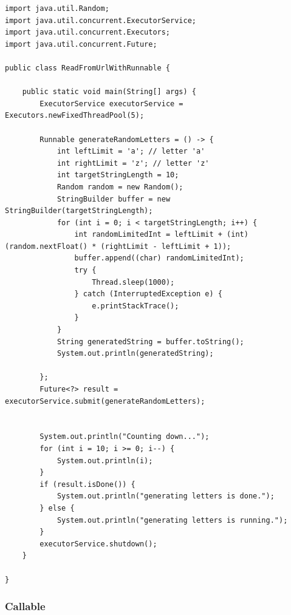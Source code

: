 \begin{lstlisting}
import java.util.Random;
import java.util.concurrent.ExecutorService;
import java.util.concurrent.Executors;
import java.util.concurrent.Future;

public class ReadFromUrlWithRunnable {

	public static void main(String[] args) {
		ExecutorService executorService = Executors.newFixedThreadPool(5);

		Runnable generateRandomLetters = () -> {
			int leftLimit = 'a'; // letter 'a'
			int rightLimit = 'z'; // letter 'z'
			int targetStringLength = 10;
			Random random = new Random();
			StringBuilder buffer = new StringBuilder(targetStringLength);
			for (int i = 0; i < targetStringLength; i++) {
				int randomLimitedInt = leftLimit + (int) (random.nextFloat() * (rightLimit - leftLimit + 1));
				buffer.append((char) randomLimitedInt);
				try {
					Thread.sleep(1000);
				} catch (InterruptedException e) {
					e.printStackTrace();
				}
			}
			String generatedString = buffer.toString();
			System.out.println(generatedString);

		};
		Future<?> result = executorService.submit(generateRandomLetters);


		System.out.println("Counting down...");
		for (int i = 10; i >= 0; i--) {
			System.out.println(i);
		}
		if (result.isDone()) {
			System.out.println("generating letters is done.");
		} else {
			System.out.println("generating letters is running.");
		}
		executorService.shutdown();
	}

}
\end{lstlisting}


\subsubsection{Callable}

